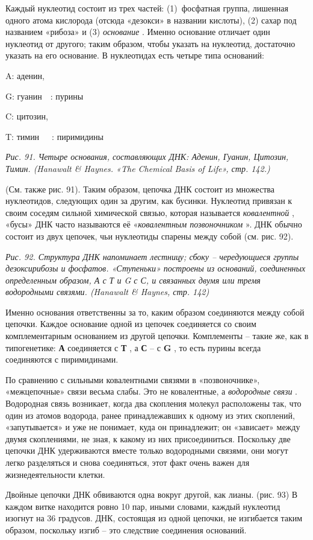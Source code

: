 \documentclass[../main.tex]{subfiles}
\begin{document}
Каждый нуклеотид состоит из трех частей: (1)~фосфатная группа, лишенная одного атома кислорода (отсюда «дезокси» в названии кислоты), (2) сахар под названием «рибоза» и (3) \emph{основание} . Именно основание отличает один нуклеотид от другого; таким образом, чтобы указать на нуклеотид, достаточно указать на его основание. В нуклеотидах есть четыре типа оснований:

A: аденин,

G: гуанин~~: пурины

C: цитозин,

T: тимин~~~: пиримидины

\emph{Рис. 91. Четыре основания, составляющих ДНК: Аденин, Гуанин, Цитозин, Тимин. (Hanawalt \& Haynes. «The Chemical Basis of Life», стр. 142.)}

(См. также рис. 91). Таким образом, цепочка ДНК состоит из множества нуклеотидов, следующих один за другим, как бусинки. Нуклеотид привязан к своим соседям сильной химической связью, которая называется \emph{ковалентной} , «бусы» ДНК часто называются её «\emph{ковалентным позвоночником} ». ДНК обычно состоит из двух цепочек, чьи нуклеотиды спарены между собой (см. рис. 92).

\emph{Рис. 92. Структура ДНК напоминает лестницу; сбоку \--- чередующиеся группы дезоксирибозы и фосфатов. «Ступеньки» построены из оснований, соединенных определенным образом, А с Т и G с С, и связанных двумя или тремя водородными связями. (Hanawalt \& Haynes, стр. 142)}

Именно основания ответственны за то, каким образом соединяются между собой цепочки. Каждое основание одной из цепочек соединяется со своим комплементарным основанием из другой цепочки. Комплементы \--- такие же, как в типогенетике: \textbf{А} соединяется с \textbf{Т} , а \textbf{С} \--- с \textbf{G} , то есть пурины всегда соединяются с пиримидинами.

По сравнению с сильными ковалентными связями в «позвоночнике», «межцепочные» связи весьма слабы. Это не ковалентные, а \emph{водородные связи} . Водородная связь возникает, когда два скопления молекул расположены так, что один из атомов водорода, ранее принадлежавших к одному из этих скоплений, «запутывается» и уже не понимает, куда он принадлежит; он «зависает» между двумя скоплениями, не зная, к какому из них присоединиться. Поскольку две цепочки ДНК удерживаются вместе только водородными связями, они могут легко разделяться и снова соединяться, этот факт очень важен для жизнедеятельности клетки.

Двойные цепочки ДНК обвиваются одна вокруг другой, как лианы. (рис. 93) В каждом витке находится ровно 10 пар, иными словами, каждый нуклеотид изогнут на 36 градусов. ДНК, состоящая из одной цепочки, не изгибается таким образом, поскольку изгиб \--- это следствие соединения оснований.
\end{document}
